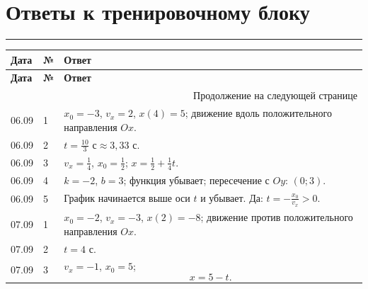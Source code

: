 \documentclass[a4paper,12pt]{article}
\newcommand{\sectionline}{%
  \par\noindent\color{accent}\rule{\linewidth}{0.5pt}\color{textgray}\par
}
\begin{document}

\clearpage

\section{\color{darkaccent}Ответы к тренировочному блоку}
\sectionline

\renewcommand{\arraystretch}{1.35}
\small

\begin{longtable}{@{}p{1.6cm}p{0.8cm}p{\dimexpr\linewidth-3.0cm\relax}@{}}
\toprule
\textbf{Дата} & \textbf{№} & \textbf{Ответ} \\
\midrule
\endfirsthead

\toprule
\textbf{Дата} & \textbf{№} & \textbf{Ответ} \\
\midrule
\endhead

\midrule
\multicolumn{3}{r}{\small Продолжение на следующей странице} \\
\endfoot

\bottomrule
\endlastfoot

06.09 & 1 &
\(x_0=-3\), \(v_x=2\), \(x(4)=5\); движение вдоль положительного направления \(Ox\). \\

06.09 & 2 &
\(\displaystyle t=\frac{10}{3}\text{ с}\approx3{,}33\text{ с}\). \\

06.09 & 3 &
\(\displaystyle v_x=\frac14\), \(\displaystyle x_0=\frac12\);
\(\displaystyle x=\frac12+\frac14t\). \\

06.09 & 4 &
\(k=-2\), \(b=3\); функция убывает; пересечение с \(Oy\): \((0;3)\). \\

06.09 & 5 &
График начинается выше оси \(t\) и убывает. Да:
\(\displaystyle t=-\frac{x_0}{v_x}>0\). \\

\midrule

07.09 & 1 &
\(x_0=-2\), \(v_x=-3\), \(x(2)=-8\); движение против положительного направления \(Ox\). \\

07.09 & 2 &
\(t=4\text{ с}\). \\

07.09 & 3 &
\(v_x=-1\), \(x_0=5\);
\[
x=5-t.
\] \\


\end{longtable}
\end{document}
